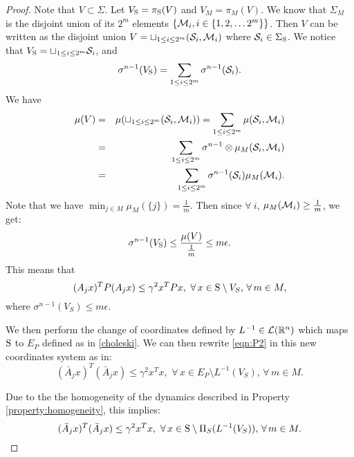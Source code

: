 \begin{proof}
Note that $V \subset \Sigma$. Let $V_{\text{S}} = \pi_{\text{S}}(V)$ and \mbox{$V_M = \pi_M (V)$}. We know that $\Sigma_M$ is the disjoint union of its $2^m$ elements $\{\mathcal{M}_i, i \in \{1,2, \ldots 2^m\} \}$. Then $V$ can be written as the disjoint union $V = \sqcup_{1 \leq i \leq 2^m} (\mathcal{S}_i, \mathcal{M}_i)$ where $\mathcal{S}_i \in \Sigma_{\text{S}}$. We notice that 
$V_{\text{S}} = \sqcup_{1 \leq i \leq 2^m} \mathcal{S}_i$, 
and
\begin{equation*}
\sigma^{n-1} (V_{\text{S}}) = \sum_{1 \leq i \leq 2^m} \sigma^{n-1} (\mathcal{S}_i).
\end{equation*}
We have 
\begin{eqnarray*}
\mu(V) &=& \mu(\sqcup_{1 \leq i \leq 2^m} (\mathcal{S}_i, \mathcal{M}_i)) = \sum_{1 \leq i \leq 2^m} \mu(\mathcal{S}_i, \mathcal{M}_i) \\
 &=& \sum_{1 \leq i \leq 2^m} \sigma^{n-1} \otimes \mu_M (\mathcal{S}_i, \mathcal{M}_i) \\
 & = &\sum_{1 \leq i \leq 2^m} \sigma^{n-1}(\mathcal{S}_i) \mu_M (\mathcal{M}_i).
\end{eqnarray*}
Note that we have $\min_{j \in M} \mu_M(\{j\}) = \frac{1}{m}.$ Then since $ \forall \ i$, $\mu_M(\mathcal{M}_i) \geq \frac{1}{m}$, we get:
\begin{equation}
\sigma^{n-1}(V_{\text{S}}) \leq \frac{\mu(V)}{\frac{1}{m}} \leq m \epsilon.
\end{equation}
This means that 
\begin{equation}\label{eqn:P2}(A_j x)^TP(A_j x) \leq {\gamma}^2x^TPx,\,\, \forall\, x \in \text{S} \setminus V_S, \,\forall\, m \in M,\end{equation}
where $\sigma^{n-1}(V_S) \leq m \epsilon.$

We then perform the change of coordinates defined by $L^{-1} \in \mathcal{L}(\mathbb{R}^n)$ which maps $\text{S}$ to $E_P$ defined as in \eqref{choleski}. We can then rewrite
\eqref{eqn:P2} in this new coordinates system as in: 
\begin{equation}\label{eqn:P}(\bar{A}_j x)^T(\bar{A}_j x) \leq {\gamma}^2x^Tx,\,\, \forall\, x \in E_P\setminus L^{-1}(V_S), \,\forall\, m \in M.\end{equation}

Due to the  the homogeneity of the dynamics described in Property \ref{property:homogeneity}, this implies:
\begin{equation}\label{eqn:P}(\bar{A}_j x)^T(\bar{A}_j x) \leq {\gamma}^2x^Tx,\,\, \forall\, x \in \text{S}\setminus \Pi_S(L^{-1}(V_S)), \,\forall\, m \in M.\end{equation}


\end{proof}
